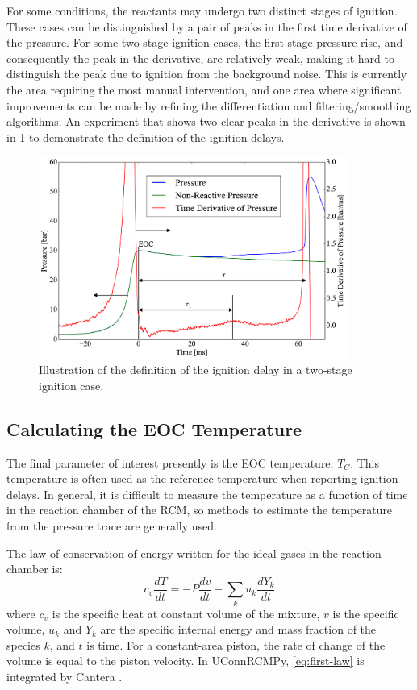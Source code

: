 \documentclass[12pt]{../ussci}
\begin{document}
For some conditions, the reactants may undergo two distinct stages of
ignition. These cases can be distinguished by a pair of peaks in the
first time derivative of the pressure. For some two-stage ignition
cases, the first-stage pressure rise, and consequently the peak in the
derivative, are relatively weak, making it hard to distinguish the peak
due to ignition from the background noise. This is currently the area
requiring the most manual intervention, and one area where significant
improvements can be made by refining the differentiation and
filtering/smoothing algorithms. An experiment that shows two clear peaks
in the derivative is shown in \cref{fig:ign-delay-def} to
demonstrate the definition of the ignition delays.

\begin{figure}[htbp]
\centering
\includegraphics[width=0.9\textwidth]{figures/ign-delay-def.png}
\caption{Illustration of the definition of the ignition delay in a
two-stage ignition case.}
\label{fig:ign-delay-def}
\end{figure}

\subsection{Calculating the EOC Temperature}\label{calculating-the-eoc-temperature}

The final parameter of interest presently is the EOC temperature,
\(T_C\). This temperature is often used as the reference temperature
when reporting ignition delays. In general, it is difficult to measure
the temperature as a function of time in the reaction chamber of the
RCM, so methods to estimate the temperature from the pressure trace are
generally used.

The law of conservation of energy written for the ideal gases in the
reaction chamber is:
%
\begin{equation} \label{eq:first-law}
    c_v \frac{dT}{dt} = -P \frac{dv}{dt} - \sum_k u_k \frac{d Y_k}{dt}
\end{equation}
%
where \(c_v\) is the specific heat at constant volume of the mixture,
\(v\) is the specific volume, \(u_k\) and \(Y_k\) are the specific
internal energy and mass fraction of the species \(k\), and \(t\) is
time. For a constant-area piston, the rate of change of the volume is
equal to the piston velocity. In UConnRCMPy, \cref{eq:first-law} is integrated by Cantera \autocite{cantera}.
\end{document}
